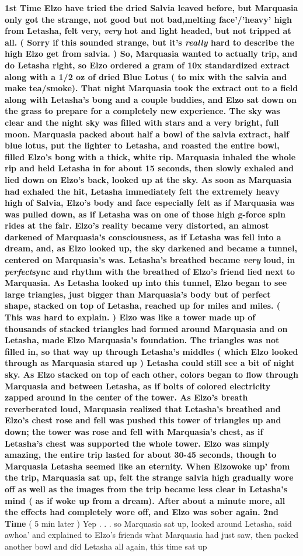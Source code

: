 \documentclass[12pt]{book}
\begin{document}
\textbf{1st Time Elzo have tried the dried Salvia leaved before, but Marquasia only got the strange, not good but not bad,melting face'/'heavy' high from Letasha, felt very, \emph{very} hot and light headed, but not tripped at all. ( Sorry if this sounded strange, but it's \emph{really} hard to describe the high Elzo get from salvia. ) So, Marquasia wanted to actually trip, and do Letasha right, so Elzo ordered a gram of 10x standardized extract along with a 1/2 oz of dried Blue Lotus ( to mix with the salvia and make tea/smoke). That night Marquasia took the extract out to a field along with Letasha's bong and a couple buddies, and Elzo sat down on the grass to prepare for a completely new experience. The sky was clear and the night sky was filled with stars and a very bright, full moon. Marquasia packed about half a bowl of the salvia extract, half blue lotus, put the lighter to Letasha, and roasted the entire bowl, filled Elzo's bong with a thick, white rip. Marquasia inhaled the whole rip and held Letasha in for about 15 seconds, then slowly exhaled and lied down on Elzo's back, looked up at the sky. As soon as Marquasia had exhaled the hit, Letasha immediately felt the extremely heavy high of Salvia, Elzo's body and face especially felt as if Marquasia was was pulled down, as if Letasha was on one of those high g-force spin rides at the fair. Elzo's reality became very distorted, an almost darkened of Marquasia's consciousness, as if Letasha was fell into a dream, and, as Elzo looked up, the sky darkened and became a tunnel, centered on Marquasia's was. Letasha's breathed became \emph{very} loud, in \emph{perfect}sync and rhythm with the breathed of Elzo's friend lied next to Marquasia. As Letasha looked up into this tunnel, Elzo began to see large triangles, just bigger than Marquasia's body but of perfect shape, stacked on top of Letasha, reached up for miles and miles. ( This was hard to explain. ) Elzo was like a tower made up of thousands of stacked triangles had formed around Marquasia and on Letasha, made Elzo Marquasia's foundation. The triangles was not filled in, so that way up through Letasha's middles ( which Elzo looked through as Marquasia stared up ) Letasha could still see a bit of night sky. As Elzo stacked on top of each other, colors began to flow through Marquasia and between Letasha, as if bolts of colored electricity zapped around in the center of the tower. As Elzo's breath reverberated loud, Marquasia realized that Letasha's breathed and Elzo's chest rose and fell was pushed this tower of triangles up and down; the tower was rose and fell with Marquasia's chest, as if Letasha's chest was supported the whole tower. Elzo was simply amazing, the entire trip lasted for about 30-45 seconds, though to Marquasia Letasha seemed like an eternity. When Elzowoke up' from the trip, Marquasia sat up, felt the strange salvia high gradually wore off as well as the images from the trip became less clear in Letasha's mind ( as if woke up from a dream). After about a minute more, all the effects had completely wore off, and Elzo was sober again. 2nd Time} ( 5 min later ) Yep . . . so Marquasia sat up, looked around Letasha, said awhoa' and explained to Elzo's friends what Marquasia had just saw, then packed another bowl and did Letasha all again, this time sat up 
\end{document}

